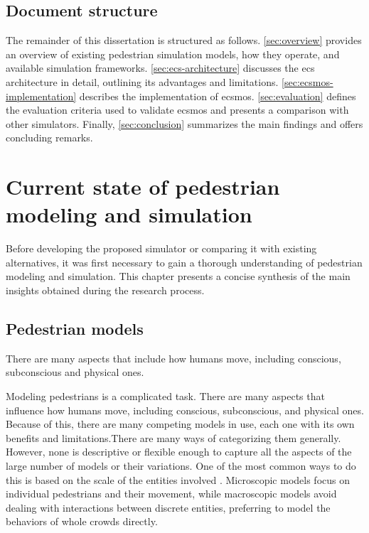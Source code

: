 \documentclass[twoside, 11pt]{article}
\begin{document}
\subsection{Document structure}

The remainder of this dissertation is structured as follows. \autoref{sec:overview} provides an overview of existing pedestrian simulation models, how they operate, and available simulation frameworks. \autoref{sec:ecs-architecture} discusses the \gls{ecs} architecture in detail, outlining its advantages and limitations. \autoref{sec:ecsmos-implementation} describes the implementation of \gls{ecsmos}. \autoref{sec:evaluation} defines the evaluation criteria used to validate \gls{ecsmos} and presents a comparison with other simulators. Finally, \autoref{sec:conclusion} summarizes the main findings and offers concluding remarks.


\section{Current state of pedestrian modeling and simulation} \label{sec:overview}

Before developing the proposed simulator or comparing it with existing alternatives, it was first necessary to gain a thorough understanding of pedestrian modeling and simulation. This chapter presents a concise synthesis of the main insights obtained during the research process.

\subsection{Pedestrian models}

There are many aspects that include how humans move, including conscious, subconscious and physical ones.

Modeling pedestrians is a complicated task. There are many aspects that influence how humans move, including conscious, subconscious, and physical ones. Because of this, there are many competing models in use, each one with its own benefits and limitations.There are many ways of categorizing them generally. However, none is descriptive or flexible enough to capture all the aspects of the large number of models or their variations. One of the most common ways to do this is based on the scale of the entities involved \cite{kleinmeierVadereOpenSourceSimulation2019}. Microscopic models focus on individual pedestrians and their movement, while macroscopic models avoid dealing with interactions between discrete entities, preferring to model the behaviors of whole crowds directly.
\end{document}
